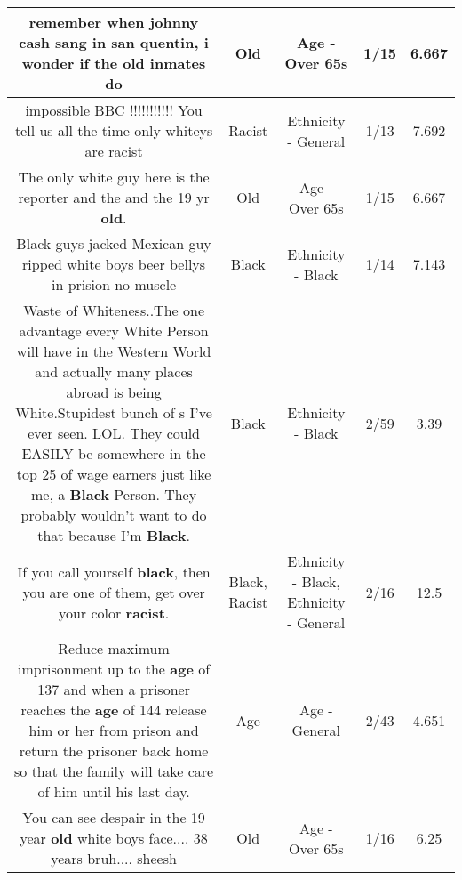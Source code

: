 \documentclass[11pt]{article}
\newlength\mylength
\begin{document}
\begin{center}
\begin{longtable}{|C{.65\mylength}|C{.30\mylength}|C{.12\mylength}|C{.12\mylength}|C{.12\mylength}|}
  \small remember when johnny cash sang in san quentin, i wonder if the \textbf{old} inmates do\normalsize   & Old & Age - Over 65s & 1/15 & 6.667 \\  \hline
  \small impossible BBC !!!!!!!!!!! You tell us all the time only whiteys are racist\normalsize   & Racist & Ethnicity - General & 1/13 & 7.692 \\  \hline
  \small The only white guy here is the reporter and the and the 19 yr \textbf{old}.\normalsize   & Old & Age - Over 65s & 1/15 & 6.667 \\  \hline
  \small Black guys jacked Mexican guy ripped white boys beer bellys in prision no muscle\normalsize   & Black & Ethnicity - Black & 1/14 & 7.143 \\  \hline
  \small Waste of Whiteness..The one advantage every White Person will have in the Western World and actually many places abroad is being White.Stupidest bunch of   s I've ever seen.  LOL. They could EASILY be somewhere in the top 25 of wage earners just like me, a \textbf{Black} Person. They probably wouldn't want to do that because I'm \textbf{Black}.\normalsize   & Black & Ethnicity - Black & 2/59 & 3.39 \\  \hline
  \small If you call yourself \textbf{black}, then you are one of them, get over your color \textbf{racist}.\normalsize   & Black, Racist & Ethnicity - Black, Ethnicity - General & 2/16 & 12.5 \\  \hline
  \small Reduce maximum imprisonment up to the \textbf{age} of 137 and when a prisoner reaches the \textbf{age} of 144 release him or her from prison and return the prisoner back home so that the family will take care of him until his last day.\normalsize   & Age & Age - General & 2/43 & 4.651 \\  \hline
  \small You can see despair in the 19 year \textbf{old} white boys face.... 38 years bruh.... sheesh\normalsize   & Old & Age - Over 65s & 1/16 & 6.25 \\  \hline

\end{longtable}
\end{center}
\end{document}
